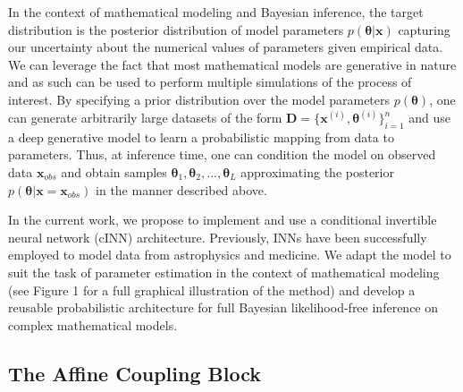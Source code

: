 \documentclass[9pt,twoside,lineno]{pnas-new}
\begin{document}
In the context of mathematical modeling and Bayesian inference, the target distribution is the posterior distribution of model parameters $p(\boldsymbol{\theta}|\boldsymbol{x})$ capturing our uncertainty about the numerical values of parameters given empirical data. We can leverage the fact that most mathematical models are generative in nature and as such can be used to perform multiple simulations of the process of interest. By specifying a prior distribution over the model parameters $p(\boldsymbol{\theta})$, one can generate arbitrarily large datasets of the form $\boldsymbol{D} = \{\boldsymbol{x}^{(i)}, \boldsymbol{\theta}^{(i)}\}_{i=1}^{n}$ and use a deep generative model to learn a probabilistic mapping from data to parameters. Thus, at inference time, one can condition the model on observed data $\boldsymbol{x}_{obs}$ and obtain samples $\boldsymbol{\theta}_{1}, \boldsymbol{\theta}_{2},...,\boldsymbol{\theta}_{L}$  approximating the posterior $p(\boldsymbol{\theta}|\boldsymbol{x}=\boldsymbol{x}_{obs})$ in the manner described above.

In the current work, we propose to implement and use a conditional invertible neural network (cINN) architecture. Previously, INNs have been successfully employed to model data from astrophysics and medicine\cite{ardizzone2018analyzing}. We adapt the model to suit the task of parameter estimation in the context of mathematical modeling (see Figure 1 for a full graphical illustration of the method) and develop a reusable probabilistic architecture for full Bayesian likelihood-free inference on complex mathematical models.

\subsection*{The Affine Coupling Block}
\end{document}
